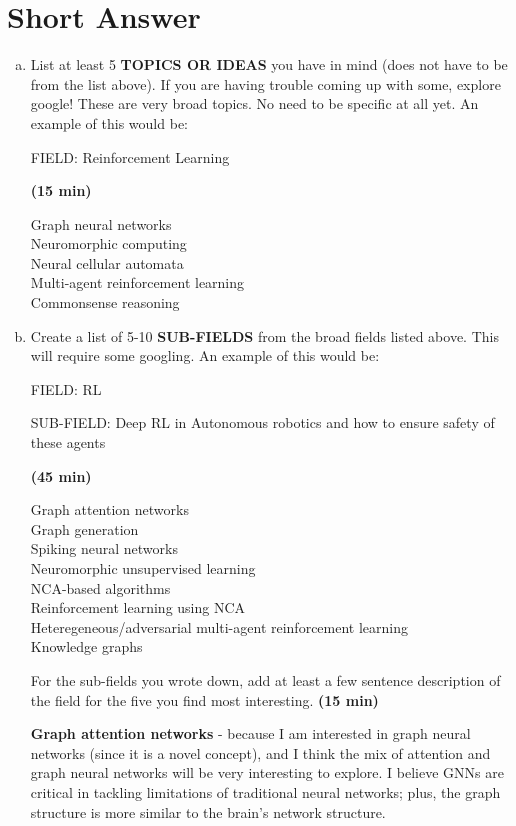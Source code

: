 \documentclass[letterpaper,11pt]{article}
\begin{document}
\section{Short Answer}
\begin{enumerate}[a)]
\item List at least 5 \textbf{TOPICS OR IDEAS} you have in mind (does not have to be from the list above). If you are having trouble coming up with some, explore google! These are very broad topics. No need to be specific at all yet. An example of this would be: 

FIELD: Reinforcement Learning

\textbf{(15 min)}

\begin{tcolorbox}
  Graph neural networks\\
  Neuromorphic computing\\
  Neural cellular automata\\
  Multi-agent reinforcement learning\\
  Commonsense reasoning
\end{tcolorbox}

\item Create a list of 5-10 \textbf{SUB-FIELDS} from the broad fields listed above. This will require some googling. An example of this would be: 

FIELD: RL

SUB-FIELD: Deep RL in Autonomous robotics and how to ensure safety of these agents

\textbf{(45 min)}

\begin{tcolorbox}
  Graph attention networks\\
  Graph generation\\
  Spiking neural networks\\
  Neuromorphic unsupervised learning\\
  NCA-based algorithms\\
  Reinforcement learning using NCA\\
  Heteregeneous/adversarial multi-agent reinforcement learning\\
  Knowledge graphs
\end{tcolorbox}

For the sub-fields you wrote down, add at least a few sentence description of the field for the five you find most interesting. \textbf{(15 min)}

\textbf{Graph attention networks} - because I am interested in graph neural networks (since it is a novel concept),
and I think the mix of attention and graph neural networks will be very interesting to explore.
I believe GNNs are critical in tackling limitations of traditional neural networks; plus, the graph
structure is more similar to the brain's network structure.


\end{enumerate}
\end{document}
